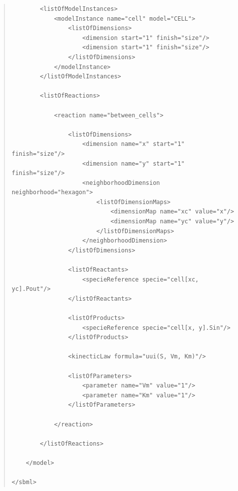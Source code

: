 \documentclass[10pt]{article}
\newcommand{\regularspacing}{\renewcommand{\baselinestretch}{1.0}}
\begin{document}
\begin{quote}
\begin{small}
\begin{verbatim}
        <listOfModelInstances>
            <modelInstance name="cell" model="CELL">
                <listOfDimensions>
                    <dimension start="1" finish="size"/>
                    <dimension start="1" finish="size"/>
                </listOfDimensions>
            </modelInstance>
        </listOfModelInstances>

        <listOfReactions>

            <reaction name="between_cells">

                <listOfDimensions>
                    <dimension name="x" start="1" finish="size"/>
                    <dimension name="y" start="1" finish="size"/>
                    <neighborhoodDimension neighborhood="hexagon">
                        <listOfDimensionMaps>
                            <dimensionMap name="xc" value="x"/>
                            <dimensionMap name="yc" value="y"/>
                        </listOfDimensionMaps>
                    </neighborhoodDimension>
                </listOfDimensions>

                <listOfReactants>
                    <specieReference specie="cell[xc, yc].Pout"/>
                </listOfReactants>

                <listOfProducts>
                    <specieReference specie="cell[x, y].Sin"/>
                </listOfProducts>

                <kinecticLaw formula="uui(S, Vm, Km)"/>

                <listOfParameters>
                    <parameter name="Vm" value="1"/>
                    <parameter name="Km" value="1"/>
                </listOfParameters>

            </reaction>

        </listOfReactions>

    </model>

</sbml>

\end{verbatim}
    \regularspacing
  \end{small}
\end{quote}


%
%
\end{document}
